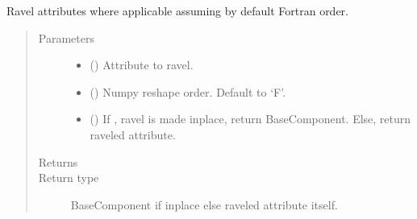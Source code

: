 \documentclass[letterpaper,10pt,english]{sphinxmanual}
\begin{document}
\begin{fulllineitems}
\begin{fulllineitems}
\label{\detokenize{api/base_classes:geology.src.base_component.BaseComponent.ravel}}
Ravel attributes where applicable assuming by default Fortran order.
\begin{quote}\begin{description}
\item[{Parameters}] \leavevmode\begin{itemize}
\item {} 
 (\sphinxstyleliteralemphasis{\sphinxupquote{, }}) \textendash{} Attribute to ravel.

\item {} 
 () \textendash{} Numpy reshape order. Default to ‘F’.

\item {} 
 () \textendash{} If , ravel is made inplace, return BaseComponent.
Else, return raveled attribute.

\end{itemize}

\item[{Returns}] \leavevmode
{}

\item[{Return type}] \leavevmode
BaseComponent if inplace else raveled attribute itself.

\end{description}\end{quote}

\end{fulllineitems}



\end{fulllineitems}
\end{document}
